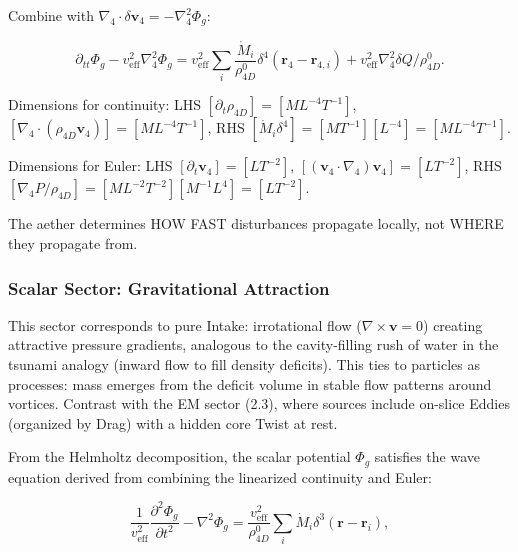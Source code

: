 Combine with $\nabla_4 \cdot \delta \mathbf{v}_4 = -\nabla_4^2 \Phi_g$:

\begin{equation}
\partial_{tt} \Phi_g - v_{\text{eff}}^2 \nabla_4^2 \Phi_g = v_{\text{eff}}^2 \sum_i \frac{\dot{M}_i}{\rho_{4D}^0} \delta^4(\mathbf{r}_4 - \mathbf{r}_{4,i}) + v_{\text{eff}}^2 \nabla_4^2 \delta Q / \rho_{4D}^0.
\end{equation}

\begin{tcolorbox}[title=Dimensional Checks]
Dimensions for continuity: LHS $[\partial_t \rho_{4D}] = [M L^{-4} T^{-1}]$, $[\nabla_4 \cdot (\rho_{4D} \mathbf{v}_4)] = [M L^{-4} T^{-1}]$, RHS $[\dot{M}_i \delta^4] = [M T^{-1}] [L^{-4}] = [M L^{-4} T^{-1}]$.

Dimensions for Euler: LHS $[\partial_t \mathbf{v}_4] = [L T^{-2}]$, $[(\mathbf{v}_4 \cdot \nabla_4) \mathbf{v}_4] = [L T^{-2}]$, RHS $[\nabla_4 P / \rho_{4D}] = [M L^{-2} T^{-2}] [M^{-1} L^{4}] = [L T^{-2}]$.
\end{tcolorbox}

\begin{tcolorbox}
The aether determines HOW FAST disturbances propagate locally, not WHERE they propagate from.
\end{tcolorbox}

\subsubsection{Scalar Sector: Gravitational Attraction}

This sector corresponds to pure Intake: irrotational flow ($\nabla \times \mathbf{v} = 0$) creating attractive pressure gradients, analogous to the cavity-filling rush of water in the tsunami analogy (inward flow to fill density deficits). This ties to particles as processes: mass emerges from the deficit volume in stable flow patterns around vortices. Contrast with the EM sector (2.3), where sources include on-slice Eddies (organized by Drag) with a hidden core Twist at rest.

From the Helmholtz decomposition, the scalar potential $\Phi_g$ satisfies the wave equation derived from combining the linearized continuity and Euler:

\begin{equation}
\frac{1}{v_{\text{eff}}^2} \frac{\partial^2 \Phi_g}{\partial t^2} - \nabla^2 \Phi_g = \frac{v_{\text{eff}}^2}{\rho_{4D}^0} \sum_i \dot{M}_i \delta^3(\mathbf{r} - \mathbf{r}_i),
\end{equation}

